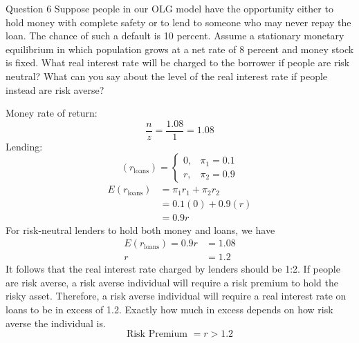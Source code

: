 \documentclass[a4paper]{article}
\newif\IfInSansMode
\numberwithin{equation}{section}
\numberwithin{figure}{section}
\begin{document}
	\begin{questionbox}{Question 6}
		Suppose people in our OLG model have the opportunity either to hold money with complete safety or to lend to someone who may never repay the loan. The chance of such a default is 10 percent. Assume a stationary monetary equilibrium in which population grows at a net rate of 8 percent and money stock is fixed. What real interest rate will be charged to the borrower if people are risk neutral? What can you say about the level of the real interest rate if people instead are risk averse?
		\begin{explanationbox}
			Money rate of return:
			\[
				\frac{n}{z} = \frac{1.08}{1} = 1.08
			\]
			Lending:
			\[
				(r_\text{loans})=
				\begin{cases}
					0, &\pi_1=0.1\\
					r, &\pi_2=0.9
				\end{cases}
			\]
			\begin{align*}
				E(r_\text{loans}) &= \pi_1 r_1 + \pi_2 r_2\\
				&= 0.1(0)+0.9(r)\\
				&=0.9r
			\end{align*}
			For risk-neutral lenders to hold both money and loans, we have
			\begin{align*}
				E(r_\text{loans}) = 0.9r &= 1.08\\
				r &= 1.2
			\end{align*}
			It follows that the real interest rate charged by lenders should be 1:2. If people are risk averse, a risk averse individual will require a risk premium to hold the risky asset. Therefore, a risk averse individual will require a real interest rate on loans to be in excess of 1.2. Exactly how much in excess depends on how risk averse the individual is.
			\[
				\text{Risk Premium } = r>1.2
			\]
		\end{explanationbox}
	\end{questionbox}
\end{document}

